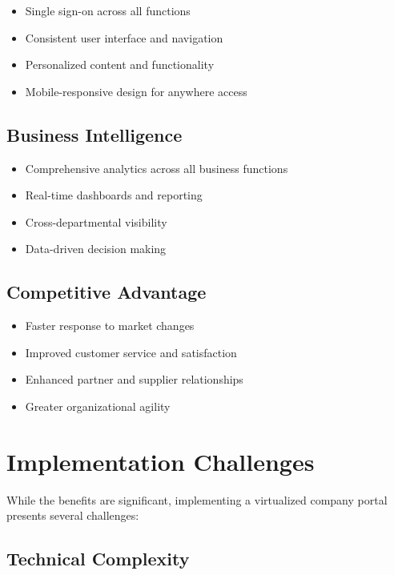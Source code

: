 \begin{itemize}
    \item Single sign-on across all functions
    \item Consistent user interface and navigation
    \item Personalized content and functionality
    \item Mobile-responsive design for anywhere access
\end{itemize}

\subsection{Business Intelligence}

\begin{itemize}
    \item Comprehensive analytics across all business functions
    \item Real-time dashboards and reporting
    \item Cross-departmental visibility
    \item Data-driven decision making
\end{itemize}

\subsection{Competitive Advantage}

\begin{itemize}
    \item Faster response to market changes
    \item Improved customer service and satisfaction
    \item Enhanced partner and supplier relationships
    \item Greater organizational agility
\end{itemize}

\section{Implementation Challenges}
\label{sec:implementation-challenges}

While the benefits are significant, implementing a virtualized company portal presents several challenges:

\subsection{Technical Complexity}

